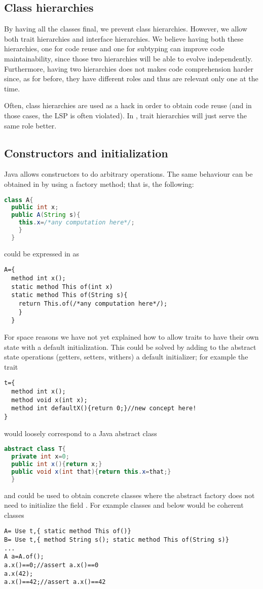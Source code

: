 \subsection{Class hierarchies}
By having all the classes final, we prevent class hierarchies.
However,
we allow both trait hierarchies and interface hierarchies.
We believe having both these hierarchies,
one for code reuse and one for subtyping can improve code
maintainability, since those two hierarchies will be able to evolve independently. Furthermore, having two hierarchies does not makes code comprehension harder since, as for before, they have different roles and thus are relevant only one at the time.

Often, class hierarchies are used as a hack in order to obtain code reuse (and in those cases, the LSP is often violated).
In \name, trait hierarchies will just serve the same role better.


\subsection{Constructors and initialization}
Java allows constructors to do arbitrary operations.
The same behaviour can be obtained in \name by using a factory method; that is, the following:
\begin{lstlisting}[language=Java]
class A{
  public int x;
  public A(String s){
    this.x=/*any computation here*/;
    }
  }
\end{lstlisting}
could be expressed in \name as 
\begin{lstlisting}
A={
  method int x();
  static method This of(int x)
  static method This of(String s){
    return This.of(/*any computation here*/);
    }
  }
\end{lstlisting}

For space reasons we have not yet explained how to allow traits to have their own state with a default initialization.
This could be solved by adding to the abstract state operations (getters, setters, withers) a default initializer;
for example the trait
\begin{lstlisting}
t={
  method int x();
  method void x(int x);
  method int defaultX(){return 0;}//new concept here!
}
\end{lstlisting}
would loosely correspond to a Java abstract class
\begin{lstlisting}[language=Java]
abstract class T{
  private int x=0;
  public int x(){return x;}
  public void x(int that){return this.x=that;}
  }
\end{lstlisting}
and could be used to obtain concrete classes where the abstract factory does not need to initialize the field \Q@x@.
For example classes \Q@A@ and \Q@B@ below would be coherent classes
\begin{lstlisting}
A= Use t,{ static method This of()}
B= Use t,{ method String s(); static method This of(String s)}
...
A a=A.of();
a.x()==0;//assert a.x()==0
a.x(42);
a.x()==42;//assert a.x()==42

\end{lstlisting}

